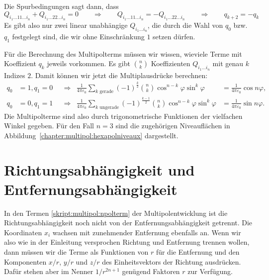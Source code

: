 Die Spurbedingungen sagt dann, dass
\[
Q_{i_1\dots 11\dots i_n}
+
Q_{i_1\dots 22\dots i_n}
=
0
\qquad\Rightarrow\qquad
Q_{i_1\dots 11\dots i_n}
=-
Q_{i_1\dots 22\dots i_n}
\qquad\Rightarrow\qquad
q_{k+2}=-q_k
\]
Es gibt also nur zwei linear unabhängige $Q_{i_1\dots i_n}$, die durch
die Wahl von $q_0$ bzw.~$q_1$ festgelegt sind, die wir ohne Einschränkung
$1$ setzen dürfen.

Für die Berechnung des Multipolterms müssen wir wissen, wieviele Terme 
mit Koeffizient $q_k$ jeweils vorkommen.
Es gibt $\binom{n}{k}$ Koeffizienten $Q_{i_1\dots i_n}$ mit genau $k$
Indizes $2$.
Damit können wir jetzt die Multiplausdrücke berechnen:
\begin{align*}
q_0&=1, q_1=0
&
&\Rightarrow&
\frac{1}{4\pi\varepsilon_0}
\sum_{\text{$k$ gerade}} (-1)^{\frac{k}2}\binom{n}{k}
	\cos^{n-k}\varphi \sin^k\varphi
&=
\frac{1}{4\pi\varepsilon_0}
\cos n\varphi,
\\
q_0&=0, q_1=1
&
&\Rightarrow&
\frac{1}{4\pi\varepsilon_0}
\sum_{\text{$k$ ungerade}} (-1)^{\frac{k-1}2}\binom{n}{k}
	\cos^{n-k}\varphi \sin^k\varphi
&=
\frac{1}{4\pi\varepsilon_0}
\sin n\varphi.
\end{align*}
Die Multipolterme sind also durch trigonometrische Funktionen der
vielfachen Winkel gegeben.
Für den Fall $n=3$ sind die zugehörigen Niveauflächen in
Abbildung~\ref{chapter:multipol:hexapolniveaux} dargestellt.

\section{Richtungsabhängigkeit und Entfernungsabhängigkeit}
In den Termen \eqref{skript:multipol:npolterm} der Multipolentwicklung
ist die Richtungsabhängigkeit noch nicht von der Entfernungsabhängigkeit
getrennt.
Die Koordinaten $x_i$ wachsen mit zunehmender Entfernung ebenfalls an.
Wenn wir also wie in der Einleitung versprochen Richtung und Entfernung
trennen wollen, dann müssen wir die Terme als Funktionen von $r$ für die
Entfernung und den Komponenten $x/r$, $y/r$ und $z/r$ des Einheitsvektors
der Richtung ausdrücken.
Dafür stehen aber im Nenner $1/r^{2n+1}$ genügend Faktoren $r$ zur Verfügung.

